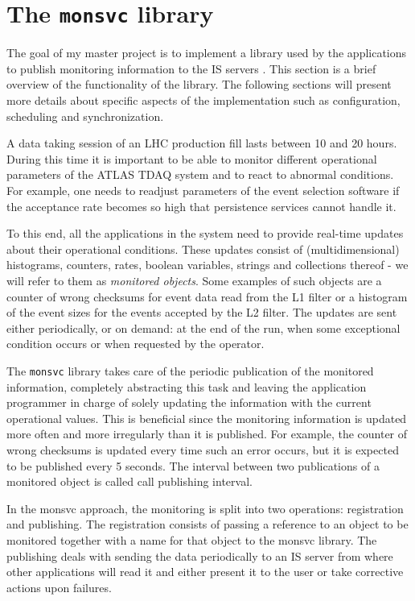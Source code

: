 \chapter{The {\tt monsvc} library} %
\label{Capitolul2}

The goal of my master project is to implement a library used by the applications to publish monitoring information to the IS servers \citep{kolosinformation}. This section is a brief overview of the functionality of the library. The following sections will present more details about specific aspects of the implementation such as configuration, scheduling and synchronization.

A data taking session of an LHC production fill lasts between 10 and 20 hours. During this time it is important to be able to monitor different operational parameters of the ATLAS TDAQ system and to react to abnormal conditions. For example, one needs to readjust parameters of the event selection software if the acceptance rate becomes so high that persistence services cannot handle it. 

To this end, all the applications in the system need to provide real-time updates about their operational conditions. These updates consist of (multidimensional) histograms, counters, rates, boolean variables, strings and collections thereof - we will refer to them as \emph{monitored objects}. Some examples of such objects are a counter of wrong checksums for event data read from the L1 filter or a histogram of the event sizes for the events accepted by the L2 filter. The updates are sent either periodically, or on demand: at the end of the run, when some exceptional condition occurs or when requested by the operator.

The {\tt monsvc} library takes care of the periodic publication of the monitored information, completely abstracting this task and leaving the application programmer in charge of solely updating the information with the current operational values. This is beneficial since the monitoring information is updated more often and more irregularly than it is published. For example, the counter of wrong checksums is updated every time such an error occurs, but it is expected to be published every 5 seconds. The interval between two publications of a monitored object is called call publishing interval.

In the monsvc approach, the monitoring is split into two operations: registration and publishing. The registration consists of passing a reference to an object to be monitored together with a name for that object to the monsvc library. The publishing deals with sending the data periodically to an IS server from where other applications will read it and either present it to the user or take corrective actions upon failures. 


